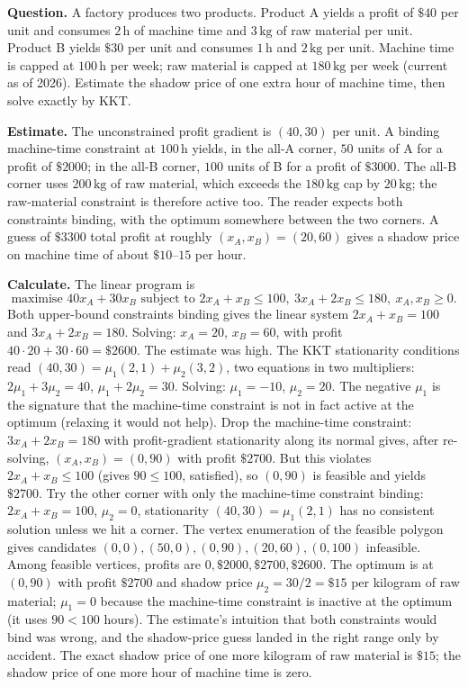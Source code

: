 \begin{estimation}
\textbf{Question.} A factory produces two products. Product A
yields a profit of $\$40$ per unit and consumes $2\,\si{\hour}$ of
machine time and $3\,\si{\kilogram}$ of raw material per unit.
Product B yields $\$30$ per unit and consumes $1\,\si{\hour}$ and
$2\,\si{\kilogram}$ per unit. Machine time is capped at
$100\,\si{\hour}$ per week; raw material is capped at
$180\,\si{\kilogram}$ per week (current as of 2026). Estimate the
shadow price of one extra hour of machine time, then solve exactly
by KKT.

\textbf{Estimate.} The unconstrained profit gradient is $(40, 30)$
per unit. A binding machine-time constraint at $100\,\si{\hour}$
yields, in the all-A corner, $50$ units of A for a profit of
$\$2000$; in the all-B corner, $100$ units of B for a profit of
$\$3000$. The all-B corner uses $200\,\si{\kilogram}$ of raw
material, which exceeds the $180\,\si{\kilogram}$ cap by
$20\,\si{\kilogram}$; the raw-material constraint is therefore
active too. The reader expects both constraints binding, with the
optimum somewhere between the two corners. A guess of $\$3300$
total profit at roughly $(x_{A}, x_{B}) = (20, 60)$ gives a shadow
price on machine time of about $\$10$--$15$ per hour.

\textbf{Calculate.} The linear program is
\[
\text{maximise } 40 x_{A} + 30 x_{B} \text{ subject to }
2 x_{A} + x_{B} \leq 100,\
3 x_{A} + 2 x_{B} \leq 180,\
x_{A}, x_{B} \geq 0.
\]
Both upper-bound constraints binding gives the linear system
$2 x_{A} + x_{B} = 100$ and $3 x_{A} + 2 x_{B} = 180$. Solving:
$x_{A} = 20$, $x_{B} = 60$, with profit $40 \cdot 20 + 30 \cdot 60
= \$2600$. The estimate was high. The KKT stationarity conditions
read $(40, 30) = \mu_{1} (2, 1) + \mu_{2} (3, 2)$, two equations
in two multipliers: $2\mu_{1} + 3\mu_{2} = 40$, $\mu_{1} + 2\mu_{2}
= 30$. Solving: $\mu_{1} = -10$, $\mu_{2} = 20$. The negative
$\mu_{1}$ is the signature that the machine-time constraint is not
in fact active at the optimum (relaxing it would not help). Drop
the machine-time constraint: $3 x_{A} + 2 x_{B} = 180$ with
profit-gradient stationarity along its normal gives, after
re-solving, $(x_{A}, x_{B}) = (0, 90)$ with profit $\$2700$. But
this violates $2 x_{A} + x_{B} \leq 100$ (gives $90 \leq 100$,
satisfied), so $(0, 90)$ is feasible and yields $\$2700$. Try the
other corner with only the machine-time constraint binding:
$2 x_{A} + x_{B} = 100$, $\mu_{2} = 0$, stationarity $(40, 30) =
\mu_{1} (2, 1)$ has no consistent solution unless we hit a corner.
The vertex enumeration of the feasible polygon gives candidates
$(0, 0), (50, 0), (0, 90), (20, 60), (0, 100)\text{ infeasible}$.
Among feasible vertices, profits are $0, \$2000, \$2700, \$2600$.
The optimum is at $(0, 90)$ with profit $\$2700$ and shadow price
$\mu_{2} = 30/2 = \$15$ per kilogram of raw material;
$\mu_{1} = 0$ because the machine-time constraint is inactive at
the optimum (it uses $90 < 100$ hours). The estimate's intuition
that both constraints would bind was wrong, and the shadow-price
guess landed in the right range only by accident. The exact
shadow price of one more kilogram of raw material is $\$15$; the
shadow price of one more hour of machine time is zero.
\end{estimation}

